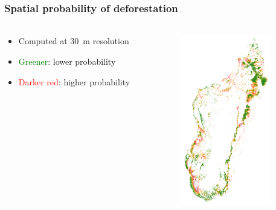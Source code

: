 \documentclass[slidetop,10pt,dvipsnames,leqno,fleqn]{beamer} %
\begin{document}
\begin{frame}
  \frametitle{Spatial probability of deforestation}
  \framesubtitle{}
  \begin{columns}
    \begin{column}{0.5\textwidth}
      \begin{block}{}
        \begin{itemize}
        \item Computed at 30~m resolution
        \item \textcolor{green}{Greener}: lower probability
        \item \textcolor{red}{Darker red}: higher probability
        \end{itemize}
      \end{block}
    \end{column}
    \begin{column}{0.5\textwidth}
      \centering \includegraphics[width=4cm]{./Figures/pred_binomial_iCAR.png}
    \end{column}
  \end{columns}
\end{frame}
\end{document}
